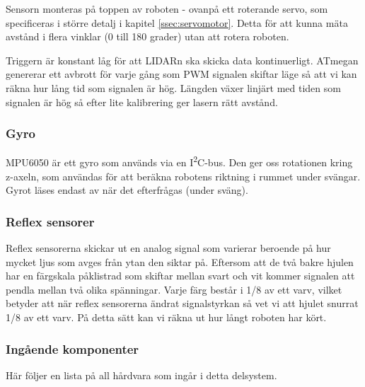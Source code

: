 \documentclass[a4paper,11pt]{article}
\begin{document}
Sensorn monteras på toppen av roboten - ovanpå ett roterande servo, som specificeras i större detalj i kapitel \ref{ssec:servomotor}. Detta för att kunna mäta avstånd i flera vinklar (0 till 180 grader) utan att rotera roboten.

Triggern är konstant låg för att LIDARn ska skicka data kontinuerligt. ATmegan genererar ett avbrott för varje gång som PWM signalen skiftar läge så att vi kan räkna hur lång tid som signalen är hög. Längden växer linjärt med tiden som signalen är hög så efter lite kalibrering ger lasern rätt avstånd.

\subsubsection{Gyro} \label{sssec:imu}
MPU6050 är ett gyro som används via en I\textsuperscript{2}C-bus. Den ger oss rotationen kring z-axeln, som användas för att beräkna robotens riktning i rummet under svängar. Gyrot läses endast av när det efterfrågas (under sväng).

\subsubsection{Reflex sensorer}
Reflex sensorerna skickar ut en analog signal som varierar beroende på hur mycket ljus som avges från ytan den siktar på. Eftersom att de två bakre hjulen har en färgskala påklistrad som skiftar mellan svart och vit kommer signalen att pendla mellan två olika spänningar. Varje färg består i 1/8 av ett varv, vilket betyder att när reflex sensorerna ändrat signalstyrkan så vet vi att hjulet snurrat 1/8 av ett varv. På detta sätt kan vi räkna ut hur långt roboten har kört.

\subsubsection{Ingående komponenter}
Här följer en lista på all hårdvara som ingår i detta delsystem.

\begin{HardwareList}
\end{HardwareList}
\end{document}
